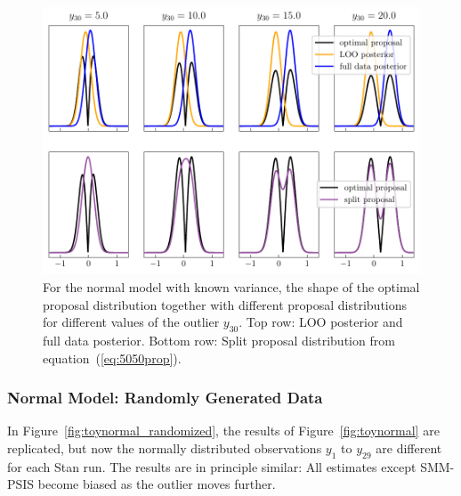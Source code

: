 \documentclass[12pt]{article}
\begin{document}
\begin{figure}[h]
\centering
\includegraphics[]{figs/normalmodel_optimal_prop.pdf}
\caption{For the normal model with known variance, the shape of
the optimal proposal distribution together with different proposal distributions
for different values of the outlier $y_{30}$.
Top row: LOO posterior and full data posterior.
Bottom row: Split proposal distribution from equation~(\ref{eq:5050prop}).} \label{fig:optimal_vs_smm_3}
\end{figure}







\subsubsection*{Normal Model: Randomly Generated Data}

In Figure~\ref{fig:toynormal_randomized}, the results of Figure~\ref{fig:toynormal}
are replicated, but now the normally distributed observations $y_{1}$ to $y_{29}$
are different for each Stan run. The results are in principle similar:
All estimates except SMM-PSIS become biased as the outlier moves further.
\end{document}
